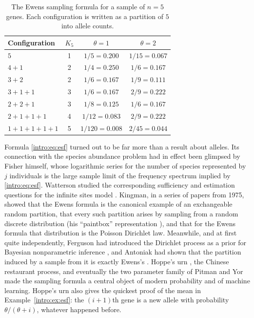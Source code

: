 \begin{table}[ht]
\centering
\small
\caption{The Ewens sampling formula for a sample of $n=5$ genes. Each configuration is written as a
partition of $5$ into allele counts.}\label{intro:tab:esf}
\begin{tabular}{lccc}
\toprule
Configuration & $K_5$ & $\theta=1$ & $\theta=2$ \\
\midrule
$5$             & 1 & $1/5=0.200$    & $1/15=0.067$ \\
$4+1$           & 2 & $1/4=0.250$    & $1/6=0.167$ \\
$3+2$           & 2 & $1/6=0.167$    & $1/9=0.111$ \\
$3+1+1$         & 3 & $1/6=0.167$    & $2/9=0.222$ \\
$2+2+1$         & 3 & $1/8=0.125$    & $1/6=0.167$ \\
$2+1+1+1$       & 4 & $1/12=0.083$   & $2/9=0.222$ \\
$1+1+1+1+1$     & 5 & $1/120=0.008$  & $2/45=0.044$ \\
\bottomrule
\end{tabular}
\end{table}

Formula \eqref{intro:eq:esf} turned out to be far more than a result about alleles. Its
connection with the species abundance problem had in effect been glimpsed by Fisher himself,
whose logarithmic series for the number of species represented by $j$ individuals
\citep{intro:fisher1943} is the large sample limit of the frequency spectrum implied by
\eqref{intro:eq:esf}. Watterson studied the corresponding sufficiency and estimation questions
for the infinite sites model \citep{intro:watterson1975}. Kingman, in a series of papers from 1975,
showed that the Ewens formula is the canonical example of an exchangeable random partition, that
every such partition arises by sampling from a random discrete distribution (his ``paintbox''
representation \citep{intro:kingman1978}), and that for the Ewens formula that distribution is the
Poisson Dirichlet law. Meanwhile, and at first quite independently, Ferguson had introduced the
Dirichlet process as a prior for Bayesian nonparametric inference \citep{intro:ferguson1973}, and
Antoniak had shown that the partition induced by a sample from it is exactly Ewens's
\citep{intro:antoniak1974}. Hoppe's urn \citep{intro:hoppe1984}, the Chinese restaurant process, and
eventually the two parameter family of Pitman and Yor \citep{intro:pitman1997} made the sampling
formula a central object of modern probability and of machine learning. Hoppe's urn also gives the
quickest proof of the mean in Example~\ref{intro:ex:esf}: the $(i+1)$th gene is a new allele with
probability $\theta/(\theta+i)$, whatever happened before.

